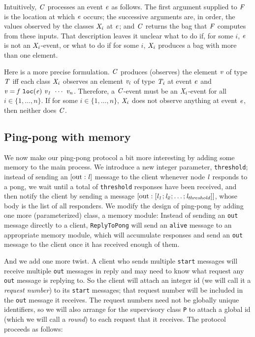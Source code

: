 \documentclass[final]{article}
\newcommand{\listinline}[1]{\text{\lstinline{#1}}}
\newcommand{\msg}[2]{\ensuremath{[\listinline{#1}:\NUPRL{#2}]}}
\begin{document}
Intuitively, $\mathit{C}$ processes an event $\mathit{e}$ as follows.
The first argument supplied to $\mathit{F}$ is the location at which
$\mathit{e}$ occurs; the successive arguments are, in order, the
values observed by the classes $\mathit{X_i}$ at $\mathit{e}$; and
$\mathit{C}$ returns the bag that $\mathit{F}$ computes from these
inputs.  That description leaves it unclear what to do if, for some
$i$, $\mathit{e}$ is not an $\mathit{X_i}$-event, or what to do if for
some $i$, $\mathit{X_i}$ produces a bag with more than one element.

Here is a more precise formulation.  $\mathit{C}$ produces (observes) the
element $\mathit{v}$ of type $\mathit{T}$ iff each class $\mathit{X_i}$
observes an element $\mathit{v_i}$ of type $\mathit{T_i}$ at event
$\mathit{e}$ and $\mathit{v} =\mathit{f}\ \mathtt{loc}(\mathit{e})\ \mathit{v_1}\ \cdots\ \mathit{v_n}$.
%
Therefore, a $\mathit{C}$-event must be an $\mathit{X_i}$-event for all
$i\in\{1,\dots,n\}$.
%
If for some $i\in\{1,\dots,n\}$, $\mathit{X_i}$ does not observe
anything at event $\mathit{e}$, then neither does $\mathit{C}$.


\subsection{Ping-pong with memory}
\label{sec:ping-pong-mem}

We now make our ping-pong protocol a bit more interesting by adding
some memory to the main process.  We introduce a new integer
parameter, \lstinline{threshold}; instead of sending an \msg{out}{l}
message to the client whenever node $\mathit{l}$ responds to a pong, we
wait until a total of \lstinline{threshold} responses have been
received, and then notify the client by sending a message
\msg{out}{[l_1;l_2;\ldots;l_{threshold}]}, whose body is the list of
all responders.  We modify the design of ping-pong by adding one more
(parameterized) class, a memory module: Instead of sending an
\lstinline{out} message directly to a client,
\lstinline{ReplyToPong} will send an \lstinline{alive} message to an
appropriate memory module, which will accumulate responses and send an
\lstinline{out} message to the client once it has received enough of
them.

And we add one more twist.  A client who sends multiple
\lstinline{start} messages will receive multiple \lstinline{out}
messages in reply and may need to know what request any
\lstinline{out} message is replying to.  So the client will attach
an integer id (we will call it a \emph{request number}) to its
\lstinline{start} messages; that request number will be included in
the \lstinline{out} message it receives.  The request numbers need
not be globally unique identifiers, so we will also arrange for the
supervisory class \lstinline{P} to attach a global id (which we
will call a \emph{round}) to each request that it receives.  The protocol
proceeds as follows:
\end{document}
